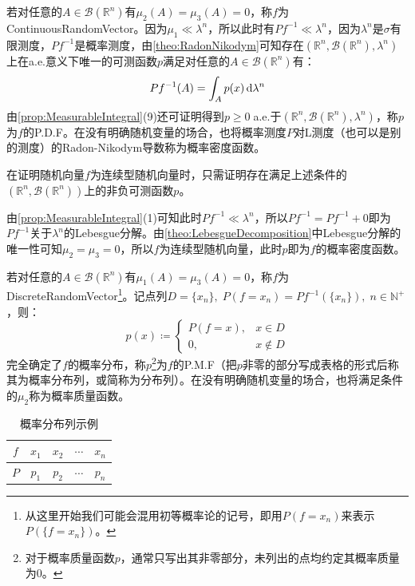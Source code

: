 若对任意的$A\in\mathcal{B}(\mathbb{R}^{n})$有$\mu_2(A)=\mu_3(A)=0$，称$f$为\gls{ContinuousRandomVector}。因为$\mu_1\ll\lambda^n$，所以此时有$Pf^{-1}\ll\lambda^n$，因为$\lambda^n$是$\sigma$有限测度，$Pf^{-1}$是概率测度，由\cref{theo:RadonNikodym}可知存在$(\mathbb{R}^{n},\mathcal{B}(\mathbb{R}^{n}),\lambda^n)$上在a.e.意义下唯一的可测函数$p$满足对任意的$A\in\mathcal{B}(\mathbb{R}^{n})$有：
\begin{equation*}
	Pf^{-1}(A)=\int_{A}p(x)\mathop{}\!\mathrm{d}\lambda^n
\end{equation*}
由\cref{prop:MeasurableIntegral}(9)还可证明得到$p\geqslant0\;$a.e.于$(\mathbb{R}^{n},\mathcal{B}(\mathbb{R}^{n}),\lambda^n)$，称$p$为$f$的\gls{P.D.F}。在没有明确随机变量的场合，也将概率测度$P$对L测度（也可以是别的测度）的Radon-Nikodym导数称为概率密度函数。
\begin{note}
	在证明随机向量$f$为连续型随机向量时，只需证明存在满足上述条件的$(\mathbb{R}^{n},\mathcal{B}(\mathbb{R}^{n}))$上的非负可测函数$p$。\par
	由\cref{prop:MeasurableIntegral}(1)可知此时$Pf^{-1}\ll\lambda^n$，所以$Pf^{-1}=Pf^{-1}+0$即为$Pf^{-1}$关于$\lambda^n$的Lebesgue分解。由\cref{theo:LebesgueDecomposition}中Lebesgue分解的唯一性可知$\mu_2=\mu_3=0$，所以$f$为连续型随机向量，此时$p$即为$f$的概率密度函数。
\end{note}
若对任意的$A\in\mathcal{B}(\mathbb{R}^{n})$有$\mu_1(A)=\mu_3(A)=0$，称$f$为\gls{DiscreteRandomVector}\footnote{从这里开始我们可能会混用初等概率论的记号，即用$P(f=x_n)$来表示$P(\{f=x_n\})$。}。记点列$D=\{x_n\},\;P(f=x_n)=Pf^{-1}(\{x_n\}),\;n\in\mathbb{N}^+$，则：
\begin{equation*}
	p(x)\coloneq
	\begin{cases}
		P(f=x),&x\in D \\
		0,&x\notin D
	\end{cases}
\end{equation*}
完全确定了$f$的概率分布，称$p$\footnote{对于概率质量函数$p$，通常只写出其非零部分，未列出的点均约定其概率质量为$0$。}为$f$的\gls{P.M.F}（把$p$非零的部分写成表格的形式后称其为概率分布列，或简称为分布列）。在没有明确随机变量的场合，也将满足条件的$\mu_2$称为概率质量函数。
\begin{table}[H]
	\centering
	\caption{概率分布列示例}
	\begin{tabular}{c|cccc}
		$f$ & $x_1$ & $x_2$ & $\cdots$ & $x_n$ \\
		\hline
		$P$ & $p_1$ & $p_2$ & $\cdots$ & $p_n$
	\end{tabular}
\end{table}
